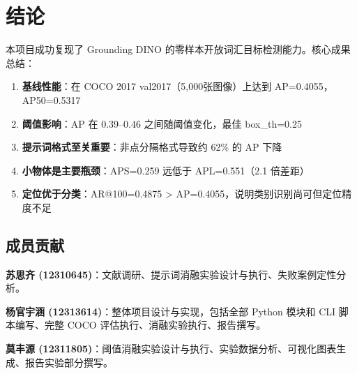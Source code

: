 \documentclass[12pt,a4paper]{ctexart}
\begin{document}
\section{结论}

本项目成功复现了 Grounding DINO 的零样本开放词汇目标检测能力。核心成果总结：

\begin{enumerate}
    \item \textbf{基线性能}：在 COCO 2017 val2017（5,000张图像）上达到 AP=0.4055，AP50=0.5317
    \item \textbf{阈值影响}：AP 在 0.39--0.46 之间随阈值变化，最佳 box\_th=0.25
    \item \textbf{提示词格式至关重要}：非点分隔格式导致约 62\% 的 AP 下降
    \item \textbf{小物体是主要瓶颈}：APS=0.259 远低于 APL=0.551（2.1 倍差距）
    \item \textbf{定位优于分类}：AR@100=0.4875 > AP=0.4055，说明类别识别尚可但定位精度不足
\end{enumerate}

\subsection*{成员贡献}

\textbf{苏思齐 (12310645)}：文献调研、提示词消融实验设计与执行、失败案例定性分析。

\textbf{杨官宇涵 (12313614)}：整体项目设计与实现，包括全部 Python 模块和 CLI 脚本编写、完整 COCO 评估执行、消融实验执行、报告撰写。

\textbf{莫丰源 (12311805)}：阈值消融实验设计与执行、实验数据分析、可视化图表生成、报告实验部分撰写。
\end{document}
